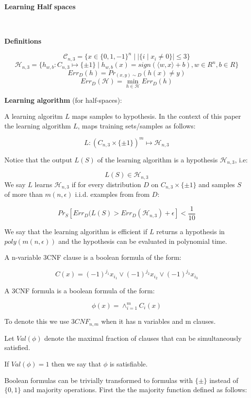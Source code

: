 \documentclass[12pt]{report}
\begin{document}
\paragraph{Learning Half spaces}\

\textbf{Definitions}

$$\mathcal{C}_{n,3} = \{ x \in \{ 0, 1, -1 \}^n \mid | \{ i \mid x_i \neq 0 \} | \leq 3 \}$$
$$\mathcal{H}_{n,3} = \{ h_{w,b} : C_{n, 3} \mapsto \{ \pm 1\} \mid h_{w,b}(x) = sign( \langle w, x \rangle + b), w \in R^n, b \in R \}$$
$$ Err_{D}(h) = Pr_{(x,y) \sim D} (h(x) \neq y)$$
$$ Err_D(\mathcal{H}) = \min_{h \in \mathcal{H}} Err_D(h)$$

\textbf{Learning algorithm} (for half-spaces):

A learning algoritm $L$ maps samples to hypothesis. In the context of this paper the learning algorithm $L$, maps training sets/samples as follows: 

$$L : (C_{n,3} \times \{ \pm 1 \} )^m \mapsto \mathcal{H}_{n,3}$$

Notice that the output $L(S)$ of the learning algorithm is a hypothesis $\mathcal{H}_{n,3}$, i.e:

$$L(S) \in \mathcal{H}_{n,3}$$
We say $L$ learns $\mathcal{H}_{n,3}$ if for every distribution $D$ on $C_{n,3} \times \{ \pm 1 \}$ and samples $S$ of more than $m(n, \epsilon)$ i.i.d. examples from from $D$:

$$ Pr_{S}[ Err_D(L(S) > Err_D(\mathcal{H}_{n,3}) + \epsilon ] < \frac{1}{10}$$

We say that the learning algorithm is efficient if $L$ returns a hypothesis in $poly(m(n, \epsilon) )$ and the hypothesis can be evaluated in polynomial time.

A n-variable 3CNF clause is a boolean formula of the form:

$$C(x) = (-1)^{j_1}x_{i_1} \vee (-1)^{j_2}x_{i_2} \vee (-1)^{j_3}x_{i_3} $$

A 3CNF formula is a boolean formula of the form:

$$ \phi(x) = \wedge^m_{i=1} C_{i}(x) $$

To denote this we use $3CNF_{n,m}$ when it has n variables and m clauses.

Let $Val(\phi)$ denote the maximal fraction of clauses that can be simultaneously satisfied.

If $Val(\phi) =  1$ then we say that $\phi$ is satisfiable.  

Boolean formulas can be trivially transformed to formulas with $\{ \pm \}$ instead of $\{ 0,1 \}$ and majority operations.
First the the majority function defined as follows:
\end{document}
